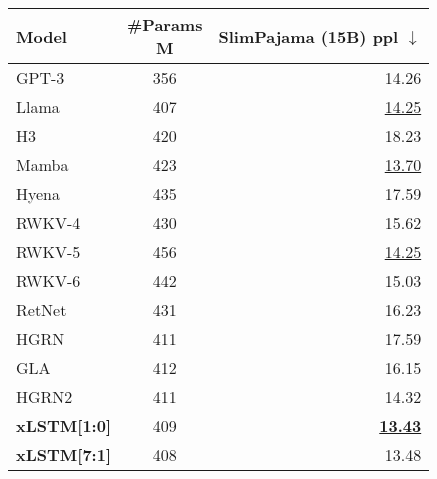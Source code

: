 \begin{tabular}{lcr}
    \toprule
    Model               & \thead{\#Params                              \\ M} & \thead{SlimPajama \\ (15B) ppl $\downarrow$}\\
    \midrule
    GPT-3               & 356             & 14.26                      \\
    Llama               & 407             & \underline{14.25}          \\
    \midrule
    H3                  & 420             & 18.23                      \\
    Mamba               & 423             & \underline{13.70}          \\
    \midrule
    Hyena               & 435             & 17.59                      \\
    RWKV-4              & 430             & 15.62                      \\
    RWKV-5              & 456             & \underline{14.25}          \\
    RWKV-6              & 442             & 15.03                      \\
    RetNet              & 431             & 16.23                      \\
    HGRN                & 411             & 17.59                      \\
    GLA                 & 412             & 16.15                      \\
    HGRN2               & 411             & 14.32                      \\
    \midrule
    \textbf{xLSTM[1:0]} & 409             & \underline{\textbf{13.43}} \\
    \textbf{xLSTM[7:1]} & 408             & 13.48                      \\
    \bottomrule
\end{tabular}
